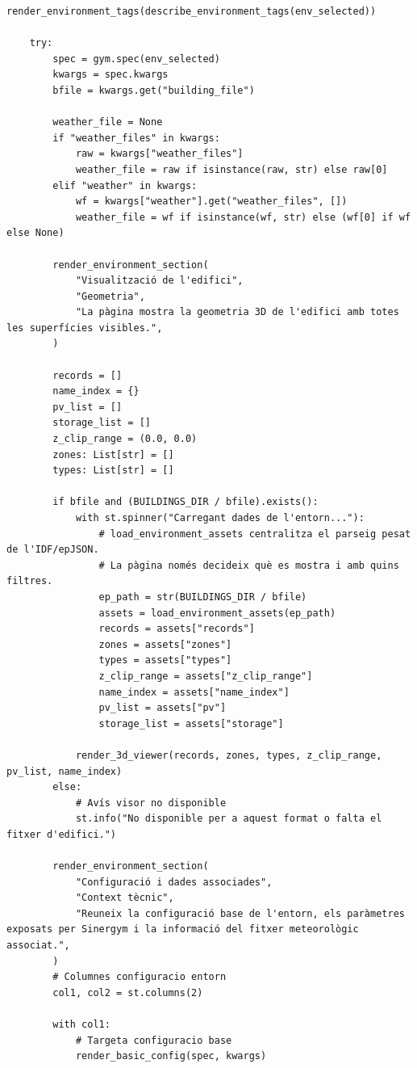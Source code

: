 \documentclass[10pt,a4paper]{article}
\begin{document}
\begin{lstlisting}[style=studioPython,caption={pages/Mostrar\_Entorn.py},label={lst:pages-mostrar-entorn-py}]
    render_environment_tags(describe_environment_tags(env_selected))

    try:
        spec = gym.spec(env_selected)
        kwargs = spec.kwargs
        bfile = kwargs.get("building_file")

        weather_file = None
        if "weather_files" in kwargs:
            raw = kwargs["weather_files"]
            weather_file = raw if isinstance(raw, str) else raw[0]
        elif "weather" in kwargs:
            wf = kwargs["weather"].get("weather_files", [])
            weather_file = wf if isinstance(wf, str) else (wf[0] if wf else None)

        render_environment_section(
            "Visualització de l'edifici",
            "Geometria",
            "La pàgina mostra la geometria 3D de l'edifici amb totes les superfícies visibles.",
        )

        records = []
        name_index = {}
        pv_list = []
        storage_list = []
        z_clip_range = (0.0, 0.0)
        zones: List[str] = []
        types: List[str] = []

        if bfile and (BUILDINGS_DIR / bfile).exists():
            with st.spinner("Carregant dades de l'entorn..."):
                # load_environment_assets centralitza el parseig pesat de l'IDF/epJSON.
                # La pàgina només decideix què es mostra i amb quins filtres.
                ep_path = str(BUILDINGS_DIR / bfile)
                assets = load_environment_assets(ep_path)
                records = assets["records"]
                zones = assets["zones"]
                types = assets["types"]
                z_clip_range = assets["z_clip_range"]
                name_index = assets["name_index"]
                pv_list = assets["pv"]
                storage_list = assets["storage"]

            render_3d_viewer(records, zones, types, z_clip_range, pv_list, name_index)
        else:
            # Avís visor no disponible
            st.info("No disponible per a aquest format o falta el fitxer d'edifici.")

        render_environment_section(
            "Configuració i dades associades",
            "Context tècnic",
            "Reuneix la configuració base de l'entorn, els paràmetres exposats per Sinergym i la informació del fitxer meteorològic associat.",
        )
        # Columnes configuracio entorn
        col1, col2 = st.columns(2)

        with col1:
            # Targeta configuracio base
            render_basic_config(spec, kwargs)


\end{lstlisting}
\end{document}
